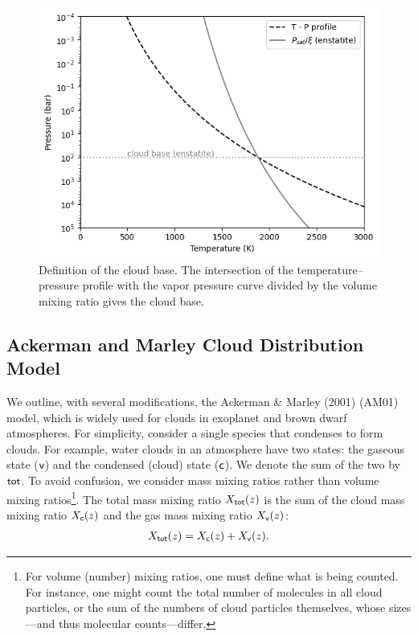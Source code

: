 \begin{figure}[htb]
\begin{center}
\includegraphics[width=\linewidth]{fig/clouds/pbase.png}
\caption{Definition of the cloud base. The intersection of the temperature–pressure profile with the vapor pressure curve divided by the volume mixing ratio gives the cloud base. \label{fig:pbase}}
\end{center}
\end{figure}

\subsection*{Ackerman and Marley Cloud Distribution Model}

We outline, with several modifications, the Ackerman \& Marley (2001) \cite{ackerman2001precipitating} (AM01) model, which is widely used for clouds in exoplanet and brown dwarf atmospheres.  
For simplicity, consider a single species that condenses to form clouds.  
For example, water clouds in an atmosphere have two states: the gaseous state (${\mathsf{v}}$) and the condensed (cloud) state (${\mathsf{c}}$).  
We denote the sum of the two by ${\mathsf{tot}}$.  
To avoid confusion, we consider mass mixing ratios rather than volume mixing ratios\footnote{For volume (number) mixing ratios, one must define what is being counted. For instance, one might count the total number of molecules in all cloud particles, or the sum of the numbers of cloud particles themselves, whose sizes—and thus molecular counts—differ.}.  
The total mass mixing ratio $X_{\mathsf{tot}} (z)$ is the sum of the cloud mass mixing ratio $X_{\mathsf{c}}(z)$ and the gas mass mixing ratio $X_{\mathsf{v}} (z)$:
\begin{align}
X_{\mathsf{tot}} (z) = X_{\mathsf{c}} (z) + X_{\mathsf{v}} (z).
\end{align}

